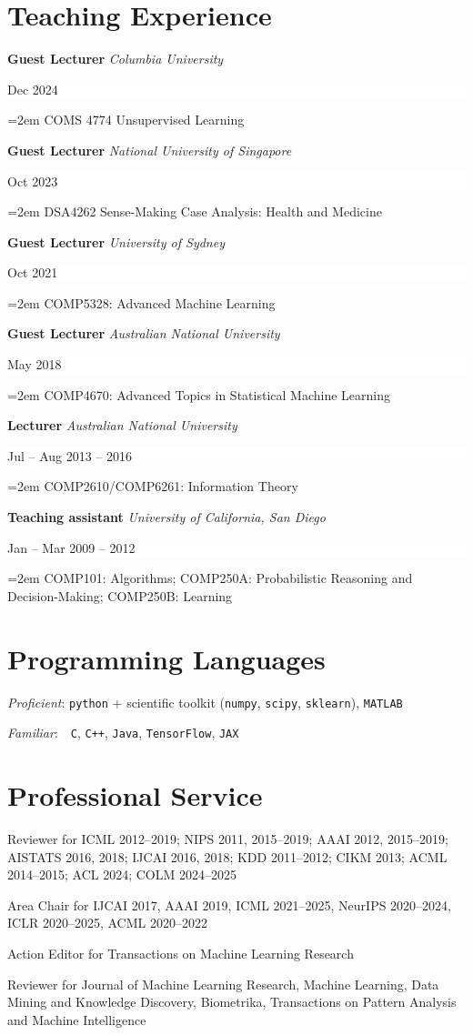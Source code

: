 \documentclass{article}
\newcommand{\NewPart}[1]{\section*{#1}}
\newcommand{\EducationEntry}[4]{
    \noindent \textbf{#1}
    \textit{#3}
    \hfill      %
    \colorbox{White}{
      \parbox{9em}{
      \hfill\color{Black}#2}} \par  %
    \noindent\hangindent=2em\hangafter=0 \small #4 %
    \normalsize \par}
\newcommand{\WorkEntry}[4]{       %
    \noindent
    \textbf{#1}
    \textit{#3} %
    \hfill      %
    \colorbox{White}{%
      \parbox{9em}{%
      \hfill\color{Black}#2}} \par   %
    \noindent\hangindent=2em\hangafter=0 \small #4 %
    \normalsize \par}
\begin{document}
\NewPart{Teaching Experience}{}

\WorkEntry
{Guest Lecturer}
{Dec 2024}
{Columbia University}
{
    COMS 4774  Unsupervised Learning
}

\WorkEntry
{Guest Lecturer}
{Oct 2023}
{National University of Singapore}
{
    DSA4262 Sense-Making Case Analysis: Health and Medicine
}

\WorkEntry
{Guest Lecturer}
{Oct 2021}
{University of Sydney}
{
    COMP5328: Advanced Machine Learning
}

\WorkEntry
{Guest Lecturer}
{May 2018}
{Australian National University}
{
    COMP4670: Advanced Topics in Statistical Machine Learning
}

\WorkEntry
{Lecturer}
{Jul -- Aug 2013 -- 2016}
{Australian National University}
{
    COMP2610/COMP6261: Information Theory
}

\WorkEntry
{Teaching assistant}
{Jan -- Mar 2009 -- 2012}
{University of California, San Diego}
{
    COMP101: Algorithms; COMP250A: Probabilistic Reasoning and Decision-Making; COMP250B: Learning
}

\NewPart{Programming Languages}{}

\emph{Proficient}: {{\tt python} + scientific toolkit ({\tt numpy}, {\tt scipy}, {\tt sklearn})},
{{\tt MATLAB}}

\noindent\emph{Familiar}: \,\ {\tt C}, {\tt C++}, {\tt Java},
{{\tt TensorFlow}},
{{\tt JAX}}


\NewPart{Professional Service}{}

\noindent
Reviewer for 
ICML 2012--2019; 
NIPS 2011, 2015--2019; 
AAAI 2012, 2015--2019; 
AISTATS 2016, 2018;
IJCAI 2016, 2018; 
KDD 2011--2012; 
CIKM 2013; 
ACML 2014--2015;
ACL 2024;
COLM 2024--2025

\medskip

\noindent
Area Chair for 
IJCAI 2017, 
AAAI 2019, 
ICML 2021--2025, 
NeurIPS 2020--2024, 
ICLR 2020--2025,
ACML 2020--2022

\medskip

\noindent
Action Editor for Transactions on Machine Learning Research

\medskip

\noindent
Reviewer for Journal of Machine Learning Research, Machine Learning, Data Mining and Knowledge Discovery, Biometrika, Transactions on Pattern Analysis and Machine Intelligence
\end{document}
